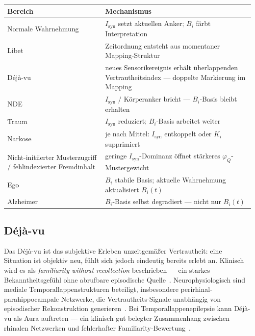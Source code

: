 \documentclass[11pt,a4paper]{article}
\begin{document}
\medskip
\begin{center}\small
\begin{tabular}{@{}p{4.2cm}p{9cm}@{}}
\toprule
Bereich & Mechanismus \\
\midrule
Normale Wahrnehmung   & $I_{\mathrm{syn}}$ setzt aktuellen Anker; $B_i$ färbt Interpretation \\
Libet                 & Zeitordnung entsteht aus momentaner Mapping-Struktur \\
Déjà-vu               & neues Sensorikereignis erhält überlappenden Vertrautheitsindex — doppelte Markierung im Mapping \\
NDE                   & $I_{\mathrm{syn}}$ / Körperanker bricht — $B_i$-Basis bleibt erhalten \\
Traum                 & $I_{\mathrm{syn}}$ reduziert; $B_i$-Basis arbeitet weiter \\
Narkose               & je nach Mittel: $I_{\mathrm{syn}}$ entkoppelt oder $K_i$ supprimiert \\
Nicht-initiierter Musterzugriff / fehlindexierter Fremdinhalt & geringe $I_{\mathrm{syn}}$-Dominanz öffnet stärkeres $\varphi_Q$-Mustergewicht \\
Ego                   & $B_i$ stabile Basis; aktuelle Wahrnehmung aktualisiert $B_i(t)$ \\
Alzheimer             & $B_i$-Basis selbst degradiert — nicht nur $B_i(t)$ \\
\bottomrule
\end{tabular}
\end{center}
\medskip

\subsection{Déjà-vu}

Das Déjà-vu ist das subjektive Erleben unzeitgemäßer Vertrautheit: eine
Situation ist objektiv neu, fühlt sich jedoch eindeutig bereits erlebt an.
Klinisch wird es als \emph{familiarity without recollection} beschrieben —
ein starkes Bekanntheitsgefühl ohne abrufbare episodische
Quelle~\citep{cleary2008}. Neurophysiologisch sind mediale
Temporallappenstrukturen beteiligt, insbesondere perirhinal-parahippocampale
Netzwerke, die Vertrautheits-Signale unabhängig von episodischer Rekonstruktion
generieren~\citep{peslova2018}. Bei Temporallappenepilepsie kann Déjà-vu als
Aura auftreten — ein klinisch gut belegter Zusammenhang zwischen rhinalen
Netzwerken und fehlerhafter Familiarity-Bewertung~\citep{illman2012,martin2021}.
\end{document}
